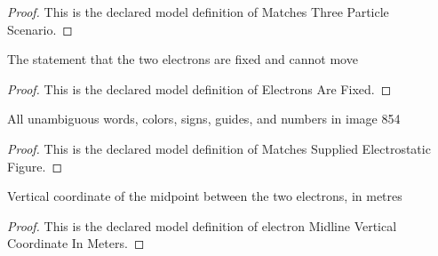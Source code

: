 \begin{proof}
  This is the declared model definition of Matches Three Particle Scenario.
\end{proof}
\begin{definition}
  \label{def:physics:phyx-mini-0854:phyxminiproblems-problemphyxmini0854-electronsarefixed}
  The statement that the two electrons are fixed and cannot move
\end{definition}
\begin{proof}
  This is the declared model definition of Electrons Are Fixed.
\end{proof}
\begin{definition}
  \label{def:physics:phyx-mini-0854:phyxminiproblems-problemphyxmini0854-matchessuppliedelectrostaticfigure}
  All unambiguous words, colors, signs, guides, and numbers in image 854
\end{definition}
\begin{proof}
  This is the declared model definition of Matches Supplied Electrostatic Figure.
\end{proof}
\begin{definition}
  \label{def:physics:phyx-mini-0854:phyxminiproblems-problemphyxmini0854-electronmidlineverticalcoordinateinmeters}
  Vertical coordinate of the midpoint between the two electrons, in metres
\end{definition}
\begin{proof}
  This is the declared model definition of electron Midline Vertical Coordinate In Meters.
\end{proof}
